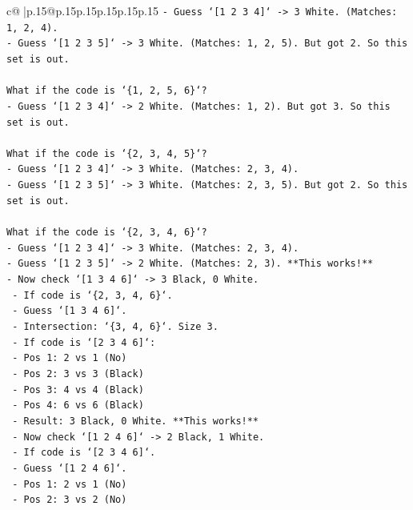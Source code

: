 \documentclass{article}
\begin{document}
{\begin{supertabular}{c@{$\;$}|p{.15\linewidth}@{}p{.15\linewidth}p{.15\linewidth}p{.15\linewidth}p{.15\linewidth}p{.15\linewidth}}
{{{\texttt{{-} Guess `{[}1 2 3 4{]}` {-}> 3 White. (Matches: 1, 2, 4).} \\
\texttt{{-} Guess `{[}1 2 3 5{]}` {-}> 3 White. (Matches: 1, 2, 5). But got 2. So this set is out.} \\
\\ 
\texttt{What if the code is `\{1, 2, 5, 6\}`?} \\
\texttt{{-} Guess `{[}1 2 3 4{]}` {-}> 2 White. (Matches: 1, 2). But got 3. So this set is out.} \\
\\ 
\texttt{What if the code is `\{2, 3, 4, 5\}`?} \\
\texttt{{-} Guess `{[}1 2 3 4{]}` {-}> 3 White. (Matches: 2, 3, 4).} \\
\texttt{{-} Guess `{[}1 2 3 5{]}` {-}> 3 White. (Matches: 2, 3, 5). But got 2. So this set is out.} \\
\\ 
\texttt{What if the code is `\{2, 3, 4, 6\}`?} \\
\texttt{{-} Guess `{[}1 2 3 4{]}` {-}> 3 White. (Matches: 2, 3, 4).} \\
\texttt{{-} Guess `{[}1 2 3 5{]}` {-}> 2 White. (Matches: 2, 3). **This works!**} \\
\texttt{{-} Now check `{[}1 3 4 6{]}` {-}> 3 Black, 0 White.} \\
\texttt{  {-} If code is `\{2, 3, 4, 6\}`.} \\
\texttt{  {-} Guess `{[}1 3 4 6{]}`.} \\
\texttt{  {-} Intersection: `\{3, 4, 6\}`. Size 3.} \\
\texttt{  {-} If code is `{[}2 3 4 6{]}`:} \\
\texttt{    {-} Pos 1: 2 vs 1 (No)} \\
\texttt{    {-} Pos 2: 3 vs 3 (Black)} \\
\texttt{    {-} Pos 3: 4 vs 4 (Black)} \\
\texttt{    {-} Pos 4: 6 vs 6 (Black)} \\
\texttt{    {-} Result: 3 Black, 0 White. **This works!**} \\
\texttt{  {-} Now check `{[}1 2 4 6{]}` {-}> 2 Black, 1 White.} \\
\texttt{    {-} If code is `{[}2 3 4 6{]}`.} \\
\texttt{    {-} Guess `{[}1 2 4 6{]}`.} \\
\texttt{    {-} Pos 1: 2 vs 1 (No)} \\
\texttt{    {-} Pos 2: 3 vs 2 (No)} \\
}}}
\end{supertabular}}
\end{document}
